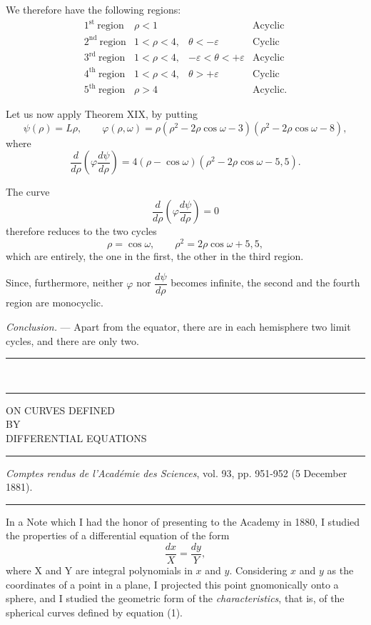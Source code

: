 \documentclass[11pt]{article}
\newcommand{\ornament}{\begin{center}\rule{2.5em}{0.4pt}\,\raisebox{0.1ex}{\tiny$\bullet\bullet\bullet$}\,\rule{2.5em}{0.4pt}\end{center}}
\newcommand{\shortline}{\begin{center}\rule{3.5em}{0.4pt}\end{center}}
\begin{document}
We therefore have the following regions:
\[
\begin{array}{llll}
1^{\mathrm{st}}\ \text{region} & \rho<1 & & \text{Acyclic}\\
2^{\mathrm{nd}}\ \text{region} & 1<\rho<4, & \theta< -\varepsilon & \text{Cyclic}\\
3^{\mathrm{rd}}\ \text{region} & 1<\rho<4, & -\varepsilon<\theta<+\varepsilon & \text{Acyclic}\\
4^{\mathrm{th}}\ \text{region} & 1<\rho<4, & \theta>+\varepsilon & \text{Cyclic}\\
5^{\mathrm{th}}\ \text{region} & \rho>4 & & \text{Acyclic.}
\end{array}
\]

Let us now apply Theorem XIX, by putting
\[
\psi(\rho)=L\rho,
\qquad
\varphi(\rho,
\omega)=\rho(\rho^2-2\rho\cos\omega-3)(\rho^2-2\rho\cos\omega-8),
\]
where
\[
\frac{d}{d\rho}\left(\varphi\frac{d\psi}{d\rho}\right)=4(\rho-
\cos\omega)(\rho^2-2\rho\cos\omega-5{,}5).
\]

The curve
\[
\frac{d}{d\rho}\left(\varphi\frac{d\psi}{d\rho}\right)=0
\]
therefore reduces to the two cycles
\[
\rho=\cos\omega,
\qquad
\rho^2=2\rho\cos\omega+5{,}5,
\]
which are entirely, the one in the first, the other in the third region.

Since, furthermore, neither $\varphi$ nor $\dfrac{d\psi}{d\rho}$ becomes infinite, the second and the fourth region are monocyclic.

\emph{Conclusion.} --- Apart from the equator, there are in each hemisphere two limit cycles, and there are only two.

\ornament


\begin{center}
{\Large ON CURVES DEFINED}\\[0.8em]
{\small BY}\\[0.8em]
{\large DIFFERENTIAL EQUATIONS}
\end{center}
\shortline
\begin{center}
\emph{Comptes rendus de l’Académie des Sciences}, vol. 93, pp. 951-952 (5 December 1881).
\end{center}
\shortline

In a Note which I had the honor of presenting to the Academy in 1880, I studied the properties of a differential equation of the form
\begin{equation}\tag{1}
\frac{dx}{X}=\frac{dy}{Y},
\end{equation}
where X and Y are integral polynomials in $x$ and $y$. Considering $x$ and $y$ as the coordinates of a point in a plane, I projected this point gnomonically onto a sphere, and I studied the geometric form of the \emph{characteristics}, that is, of the spherical curves defined by equation (1).
\end{document}
